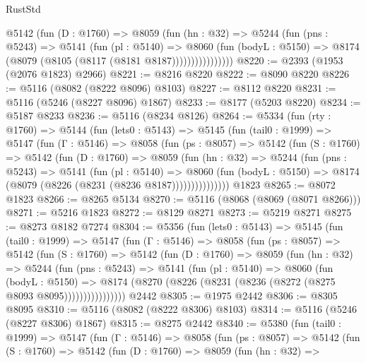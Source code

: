 \begin{lexlean}{RustStd}
\begin{coremodule}
                @5142
                  (fun (D : @1760) =>
                  @8059
                    (fun (hn : @32) =>
                    @5244
                      (fun (pns : @5243) =>
                      @5141
                        (fun (pl : @5140) =>
                        @8060
                          (fun (bodyL : @5150) =>
                          @8174 (@8079 (@8105 (@8117 (@8181 @8187))))))))))))))))
@8220 := @2393 (@1953 (@2076 @1823) @2966)
@8221 := @8216 @8220
@8222 := @8090 @8220
@8226 := @5116 (@8082 (@8222 @8096) @8103)
@8227 := @8112 @8220
@8231 := @5116 (@5246 (@8227 @8096) @1867)
@8233 := @8177 (@5203 @8220)
@8234 := @5187 @8233
@8236 := @5116 (@8234 @8126)
@8264 := @5334
    (fun (rty : @1760) =>
    @5144
      (fun (lets0 : @5143) =>
      @5145
        (fun (tail0 : @1999) =>
        @5147
          (fun (Γ : @5146) =>
          @8058
            (fun (ps : @8057) =>
            @5142
              (fun (S : @1760) =>
              @5142
                (fun (D : @1760) =>
                @8059
                  (fun (hn : @32) =>
                  @5244
                    (fun (pns : @5243) =>
                    @5141
                      (fun (pl : @5140) =>
                      @8060
                        (fun (bodyL : @5150) =>
                        @8174 (@8079 (@8226 (@8231 (@8236 @8187)))))))))))))))
    @1823
@8265 := @8072 @1823
@8266 := @8265 @5134
@8270 := @5116 (@8068 (@8069 (@8071 @8266)))
@8271 := @5216 @1823
@8272 := @8129 @8271
@8273 := @5219 @8271
@8275 := @8273 @8182 @7274
@8304 := @5356
    (fun (lets0 : @5143) =>
    @5145
      (fun (tail0 : @1999) =>
      @5147
        (fun (Γ : @5146) =>
        @8058
          (fun (ps : @8057) =>
          @5142
            (fun (S : @1760) =>
            @5142
              (fun (D : @1760) =>
              @8059
                (fun (hn : @32) =>
                @5244
                  (fun (pns : @5243) =>
                  @5141
                    (fun (pl : @5140) =>
                    @8060
                      (fun (bodyL : @5150) =>
                      @8174 (@8270 (@8226 (@8231 (@8236 (@8272 (@8275 @8093 @8095))))))))))))))))
    @2442
@8305 := @1975 @2442
@8306 := @8305 @8095
@8310 := @5116 (@8082 (@8222 @8306) @8103)
@8314 := @5116 (@5246 (@8227 @8306) @1867)
@8315 := @8275 @2442
@8340 := @5380
    (fun (tail0 : @1999) =>
    @5147
      (fun (Γ : @5146) =>
      @8058
        (fun (ps : @8057) =>
        @5142
          (fun (S : @1760) =>
          @5142
            (fun (D : @1760) =>
            @8059
              (fun (hn : @32) =>

\end{coremodule}
\end{lexlean}
